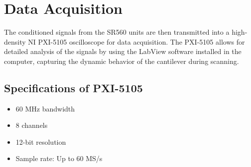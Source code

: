 \documentclass[a4paper, 12pt]{article}
\begin{document}
	\section*{Data Acquisition}
	
	The conditioned signals from the SR560 units are then transmitted into a high-density NI PXI-5105 oscilloscope for data acquisition.	The PXI-5105 allows for detailed analysis of the signals by using the LabView software installed in the computer, capturing the dynamic behavior of the cantilever during scanning. 
	
	
	
	\subsection*{Specifications of PXI-5105}
	
	\begin{itemize}
		\item 60 MHz bandwidth
		\item 8 channels
		\item 12-bit resolution
		\item Sample rate: Up to 60 MS/s
	\end{itemize}
	
	
	
	
	
	
\end{document}
